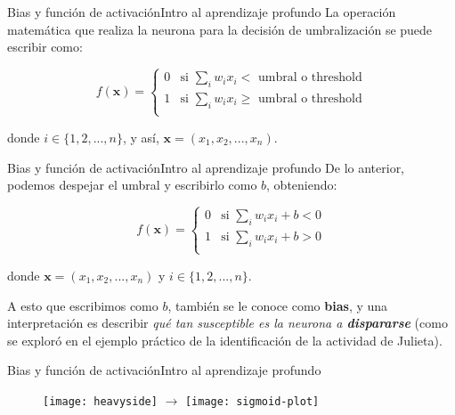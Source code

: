 \documentclass[10pt,border=3pt,tikz]{beamer}
\begin{document}
    \begin{frame}{Bias y función de activación}{Intro al aprendizaje profundo}
        La operación matemática que realiza la neurona para la decisión de umbralización se puede escribir como:
        
        $$ f(\textbf{x}) =
        \begin{cases}
            0 & \text{si $\displaystyle\sum_{i}w_ix_i <$ umbral o threshold} \\
            1 & \text{si $\displaystyle\sum_{i}w_ix_i \geq$ umbral o threshold} \\
        \end{cases}$$
        
        donde $i \in \{1, 2, ..., n\}$, y así, $\textbf{x} = (x_1, x_2, ..., x_n)$.
    \end{frame}
    
    \begin{frame}{Bias y función de activación}{Intro al aprendizaje profundo}
        De lo anterior, podemos despejar el umbral y escribirlo como $b$, obteniendo:
        
        $$ f(\textbf{x}) =
        \begin{cases}
            0 & \text{si $\displaystyle\sum_{i}w_ix_i + b < 0$} \\
            1 & \text{si $\displaystyle\sum_{i}w_ix_i + b > 0$} \\
        \end{cases}$$
        
        donde $\textbf{x} = (x_1, x_2, ..., x_n)$ y $i \in \{1, 2, ..., n\}$.

        A esto que escribimos como $b$, también se le conoce como \textbf{bias}, y una interpretación es describir \textit{qué tan susceptible es la neurona a \textbf{dispararse}} (como se exploró en el ejemplo práctico de la identificación de la actividad de Julieta).
    \end{frame}
    
    \begin{frame}{Bias y función de activación}{Intro al aprendizaje profundo}
        \begin{figure}
            \centering
            \texttt{[image: heavyside]} $\longrightarrow$
            \texttt{[image: sigmoid-plot]}
        \end{figure}
    \end{frame}
    
\end{document}
